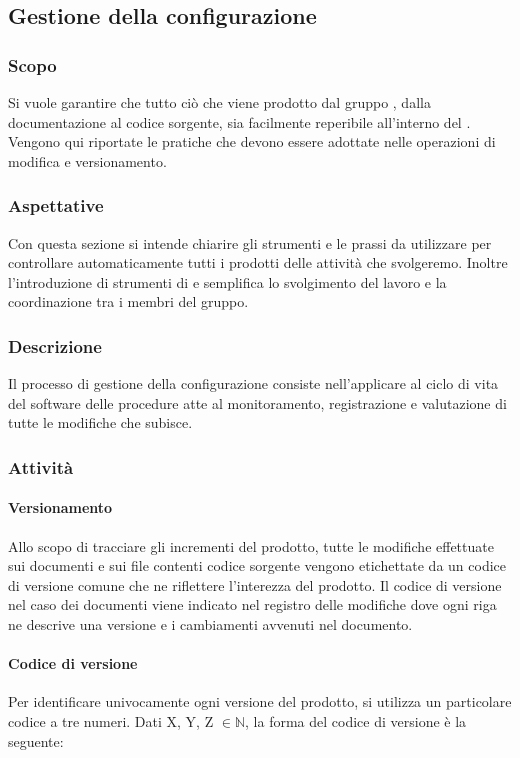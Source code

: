 \subsection{Gestione della configurazione}

\subsubsection{Scopo}
Si vuole garantire che tutto ciò che viene prodotto dal gruppo \Gruppo{}, dalla documentazione al codice sorgente, sia facilmente reperibile all’interno del .
Vengono qui riportate le pratiche che devono essere adottate nelle operazioni di modifica e versionamento.

\subsubsection{Aspettative}
Con questa sezione si intende chiarire gli strumenti e le prassi da utilizzare per controllare automaticamente tutti i prodotti delle attività che svolgeremo.
Inoltre l'introduzione di strumenti di  e  semplifica lo svolgimento del lavoro e la coordinazione tra i membri del gruppo.

\subsubsection{Descrizione}
Il processo di gestione della configurazione consiste nell'applicare al ciclo di vita del software delle procedure atte al monitoramento, registrazione e valutazione di tutte 
le modifiche che subisce.

\subsubsection{Attività}

\paragraph{Versionamento}
Allo scopo di tracciare gli incrementi del prodotto, tutte le modifiche effettuate sui documenti e sui file contenti codice sorgente vengono etichettate da un codice di versione comune che ne riflettere l'interezza del prodotto. Il codice di versione nel caso dei documenti viene indicato nel registro delle modifiche dove ogni riga ne descrive una versione e i cambiamenti avvenuti nel documento.

\paragraph*{Codice di versione}
Per identificare univocamente ogni versione del prodotto, si utilizza un particolare codice a tre numeri. Dati X, Y, Z $\in \mathbb{N}$, la forma del codice di versione è la seguente:

